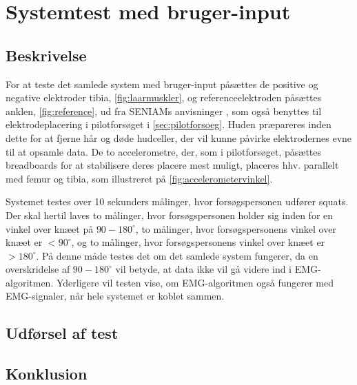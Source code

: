 \section{Systemtest med bruger-input}

\subsection{Beskrivelse}
For at teste det samlede system med bruger-input påsættes de positive og negative elektroder tibia, \autoref{fig:laarmuskler}, og referenceelektroden påsættes anklen, \autoref{fig:reference}, ud fra SENIAMs anvisninger \citep{seniam2016}, som også benyttes til elektrodeplacering i pilotforsøget i \autoref{sec:pilotforsoeg}. Huden præpareres inden dette for at fjerne hår og døde hudceller, der vil kunne påvirke elektrodernes evne til at opsamle data. 
De to accelerometre, der, som i pilotforsøget, påsættes breadboards for at stabilisere deres placere mest muligt, placeres hhv. parallelt med femur og tibia, som illustreret på \autoref{fig:accelerometervinkel}.

Systemet testes over 10 sekunders målinger, hvor forsøgspersonen udfører squats. Der skal hertil laves to målinger, hvor forsøgspersonen holder sig inden for en vinkel over knæet på $90-180^{\circ}$, to målinger, hvor forsøgspersonens vinkel over knæet er $<90^{\circ}$, og to målinger, hvor forsøgspersonens vinkel over knæet er $>180^{\circ}$. På denne måde testes det om det samlede system fungerer, da en overskridelse af $90-180^{\circ}$ vil betyde, at data ikke vil gå videre ind i EMG-algoritmen. Yderligere vil testen vise, om EMG-algoritmen også fungerer med EMG-signaler, når hele systemet er koblet sammen. 

\subsection{Udførsel af test}


\subsection{Konklusion}
